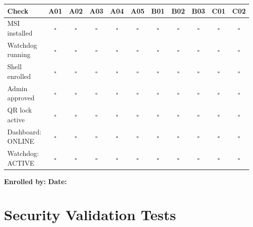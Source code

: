 \noindent\begin{tabular}{|l|c|c|c|c|c|c|c|c|c|c|}
\hline
\textbf{Check} & \textbf{A01} & \textbf{A02} & \textbf{A03} & \textbf{A04} & \textbf{A05} & \textbf{B01} & \textbf{B02} & \textbf{B03} & \textbf{C01} & \textbf{C02}\\
\hline
MSI installed & $\square$ & $\square$ & $\square$ & $\square$ & $\square$ & $\square$ & $\square$ & $\square$ & $\square$ & $\square$\\
\hline
Watchdog running & $\square$ & $\square$ & $\square$ & $\square$ & $\square$ & $\square$ & $\square$ & $\square$ & $\square$ & $\square$\\
\hline
Shell enrolled & $\square$ & $\square$ & $\square$ & $\square$ & $\square$ & $\square$ & $\square$ & $\square$ & $\square$ & $\square$\\
\hline
Admin approved & $\square$ & $\square$ & $\square$ & $\square$ & $\square$ & $\square$ & $\square$ & $\square$ & $\square$ & $\square$\\
\hline
QR lock active & $\square$ & $\square$ & $\square$ & $\square$ & $\square$ & $\square$ & $\square$ & $\square$ & $\square$ & $\square$\\
\hline
Dashboard: ONLINE & $\square$ & $\square$ & $\square$ & $\square$ & $\square$ & $\square$ & $\square$ & $\square$ & $\square$ & $\square$\\
\hline
Watchdog: ACTIVE & $\square$ & $\square$ & $\square$ & $\square$ & $\square$ & $\square$ & $\square$ & $\square$ & $\square$ & $\square$\\
\hline
\end{tabular}

\vspace{1em}
\textbf{Enrolled by:} \underline{\hspace{6cm}} \quad \textbf{Date:} \underline{\hspace{3cm}}

\section{Security Validation Tests}

